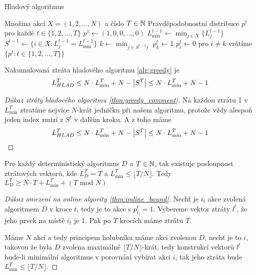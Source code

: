 \begin{algorithm}
    \algrenewcommand{}
    \algrenewcommand{}
    \caption{Hladový algoritmus}
    \label{alg:greedy}
    \begin{algorithmic}[1]
        \Require  Množina akcí $X =(1,2,\dots,N)$ a číslo $T \in \mathbb{N}$
        \Ensure Pravděpodobnostní distribuce $p^t$ pro každé $t \in \{1,2,\dots, T\}$
        \State $p^1 \leftarrow (1,0,0,\dots,0)$
        \State $L^{t-1}_{\min} \leftarrow \min_{j \in X} \{L^{t-1}_j\}$ 
        \State $S^{t-1} \leftarrow \{i\in X: L^{t-1}_j = L^{t-1}_{\min}\}$
        \State $k \leftarrow \min_{j \in S^{t-1} j}$
        \State $p_k^t \leftarrow 1$
        \State $p^t_i \leftarrow 0$ pro $i \neq k$
        \EndFor
        \State vrátíme $\{p^t: t\in \{1,2,\dots,T\}\}$
    \end{algorithmic}
\end{algorithm}

\begin{theorem}
\label{thm:greedy_comment}
Nakumulovaná ztráta hladového algoritmu \ref{alg:greedy} je
$$ 
L^T_{HLAD} \leq N \cdot L^T_{\min} + N - \left|S^T\right| \leq N \cdot L^T_{\min} + N - 1
$$
\end{theorem}
\begin{proof}[Důkaz ztráty hladového algoritmu \ref{thm:greedy_comment}]
Na každou ztrátu 1 v $L^T_{\min}$ ztratíme nejvíce $N$-krát jedničku při našem algoritmu, protože vždy alespoň jeden index zmizí z $S^t$ v dalším kroku. 
A z toho máme 
$$ 
L^T_{HLAD} \leq N \cdot L^T_{\min} + N - \left|S^T\right| \leq N \cdot L^T_{\min} + N - 1
$$
\end{proof}
\begin{theorem}\label{thm:online_bound}
Pro každý deterministický algoritmus $D$ a $T\in \mathbb{N}$, tak existuje posloupnost ztrátových vektorů, kde $L^T_D = T$ a $L^T_{\min} \leq \lfloor T/N \rfloor$. 
Tedy $L_D^T \geq N \cdot T + L^T_{\min} + (T \text{ mod } N)$
\end{theorem}
\begin{proof}[Důkaz omezení na online algority \ref{thm:online_bound}]
    Nechť je $i_t$ akce zvolená algoritmem $D$ v kroce $t$, tedy je to akce s $p^t_{i_t} =1$. 
    Vybereme vektor ztráty $l^t$, že jeho prvek na místě $i_t$ je 1. 
    Pak po $T$ krocích máme ztrátu $T$. 

    Máme $N$ akcí a tedy principem holubníku máme akci zvolenou $D$, nechť je to $i$, takovou že byla $D$ zvolena maximálně $\lfloor T/N \rfloor$-krát, tedy konstrukcí vektorů $l^t$ bude-li minimální algoritmus v porovnání vybírat akci $i$, tak jeho ztráta bude $L^T_{\min} \leq \lfloor T/N \rfloor$.
\end{proof}

